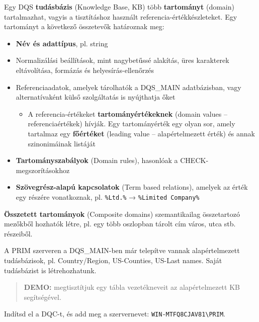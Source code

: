 \documentclass[
  magyar,
]{article}
\providecommand{\tightlist}{%
  \setlength{\itemsep}{0pt}\setlength{\parskip}{0pt}}
\begin{document}
Egy DQS \textbf{tudásbázis} (Knowledge Base, KB) több
\textbf{tartományt} (domain) tartalmazhat, vagyis a tisztításhoz
használt referencia-értékkészleteket. Egy tartományt a következő
összetevők határoznak meg:

\begin{itemize}
\tightlist
\item
  \textbf{Név és adattípus}, pl. string
\item
  Normalizálási beállítások, mint nagybetűssé alakítás, üres karakterek
  eltávolítása, formázás és helyesírás-ellenőrzés
\item
  Referenciaadatok, amelyek tárolhatók a DQS\_MAIN adatbázisban, vagy
  alternatívaként külső szolgáltatás is nyújthatja őket

  \begin{itemize}
  \tightlist
  \item
    A referencia-értékeket \textbf{tartományértékeknek} (domain values
    -- referenciaértékek) hívják. Egy tartományérték egy olyan sor,
    amely tartalmaz egy \textbf{főértéket} (leading value --
    alapértelmezett érték) és annak szinonimáinak listáját
  \end{itemize}
\item
  \textbf{Tartományszabályok} (Domain rules), hasonlóak a
  CHECK-megszorításokhoz
\item
  \textbf{Szövegrész-alapú kapcsolatok} (Term based relations), amelyek
  az érték egy részére vonatkoznak, pl.
  \texttt{\textquotesingle{}\%Ltd.\%\textquotesingle{}} →
  \texttt{\textquotesingle{}\%Limited\ Company\%\textquotesingle{}}
\end{itemize}

\textbf{Összetett tartományok} (Composite domains) szemantikailag
összetartozó mezőkből hozhatók létre, pl. egy több oszlopban tárolt cím
város, utca stb. részeiből.

A PRIM szerveren a DQS\_MAIN-ben már telepítve vannak alapértelmezett
tudásbázisok, pl. Country/Region, US-Counties, US-Last names. Saját
tudásbázist is létrehozhatunk.

\begin{quote}
\textbf{DEMO:} megtisztítjuk egy tábla vezetékneveit az alapértelmezett
KB segítségével.
\end{quote}

Indítsd el a DQC-t, és add meg a szervernevet:
\texttt{WIN-MTFQ8CJAV81\textbackslash{}PRIM}.
\end{document}
